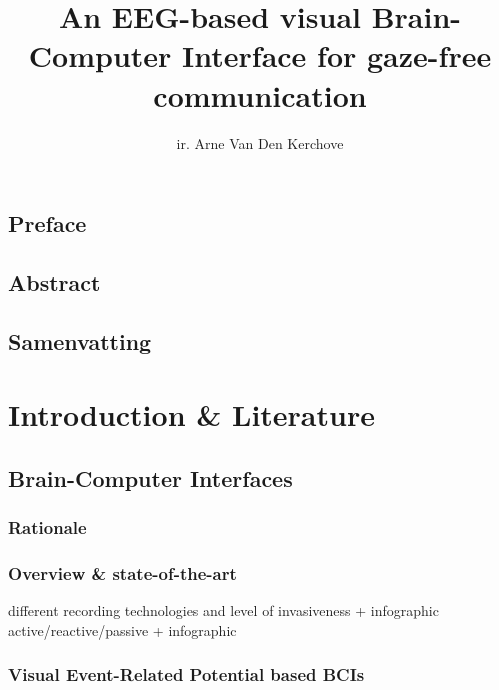 %
\usepackage{todonotes}
\usepackage{lipsum}
\usepackage{hyperref}
\usepackage{tabularx}
\usepackage{booktabs}
\usepackage{enumitem}



\usepackage[backend=biber]{biblatex}



\title{\sffamily An EEG-based visual Brain-Computer Interface for gaze-free communication}
\author{ir. Arne Van Den Kerchove}




\pagestyle{front}
\frontmatter

\chapter{Preface}
\lipsum[1]
\chapter{Abstract}
\lipsum[2-4]
\chapter{Samenvatting}
\lipsum[5-7]
\tableofcontents
\listoffigures
\listoftables



\mainmatter
\pagestyle{main}


\part{Introduction \& Literature}

\chapter{Brain-Computer Interfaces}
\begin{refsection}
\section{Rationale}
\section{Overview \& state-of-the-art}
different recording technologies and level of invasiveness + infographic
active/reactive/passive + infographic
\section{Visual Event-Related Potential based BCIs}
\printbibliography[heading=subbibliography]
\end{refsection}

